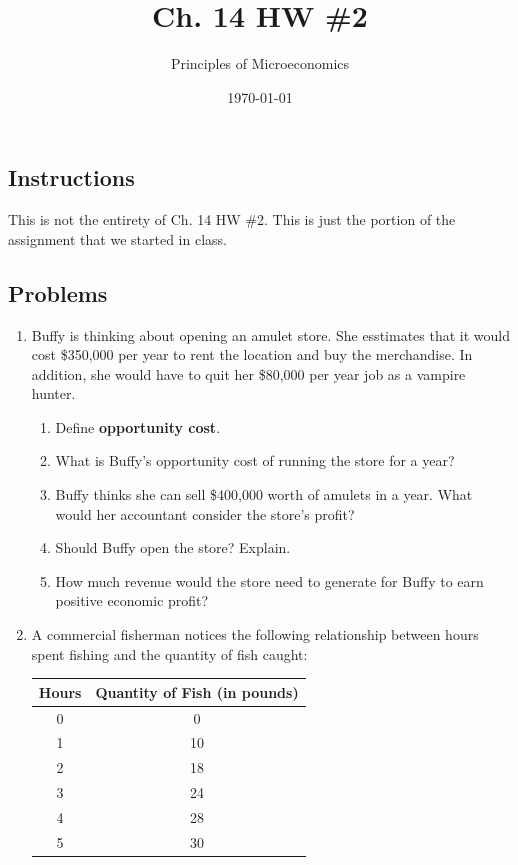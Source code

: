 \documentclass{article}
\title{Ch. 14 HW \#2}
\author{Principles of Microeconomics}
\date{\today}
\begin{document}
\maketitle

\subsection*{Instructions} This is not the entirety of Ch. 14 HW \#2. This is just the portion of the assignment that we started in class.

\subsection*{Problems}

\begin{enumerate}

\item Buffy is thinking about opening an amulet store. She esstimates that it would cost \$350,000 per year to rent the location and buy the merchandise. In addition, she would have to quit her \$80,000 per year job as a vampire hunter.

	\begin{enumerate}
	
	\item Define \textbf{opportunity cost}.
	
	\item What is Buffy's opportunity cost of running the store for a year?
	
	\item Buffy thinks she can sell \$400,000 worth of amulets in a year. What would her accountant consider the store's profit?
	
	\item Should Buffy open the store? Explain.
	
	\item How much revenue would the store need to generate for Buffy to earn positive economic profit?
	
	\end{enumerate}
	
\item A commercial fisherman notices the following relationship between hours spent fishing and the quantity of fish caught:

	\begin{center}
	\begin{tabular}{ c | c }
	\textbf{Hours} & \textbf{Quantity of Fish (in pounds)} \\
	\hline
	0 & 0 \\
	1 & 10 \\
	2 & 18 \\
	3 & 24 \\
	4 & 28 \\
	5 & 30 \\
	\end{tabular}
	\end{center}
	

\end{enumerate}
\end{document}
